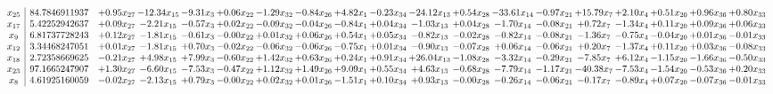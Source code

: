 \documentclass[9pt]{article}
\begin{document}
 \[\begin{array}{c| c c@{\hskip 2pt} c@{\hskip 2pt} c@{\hskip 2pt} c@{\hskip 2pt} c@{\hskip 2pt} c@{\hskip 2pt} c@{\hskip 2pt} c@{\hskip 2pt} c@{\hskip 2pt} c@{\hskip 2pt} c@{\hskip 2pt} c@{\hskip 2pt} c@{\hskip 2pt} c@{\hskip 2pt} c@{\hskip 2pt} c@{\hskip 2pt} c@{\hskip 2pt} }
 x_{25}   &  84.7846911937 & +  0.95 x_{27} & -12.34 x_{15} & -9.31 x_{3} & +  0.06 x_{22} & -1.29 x_{32} & -0.84 x_{26} & +  4.82 x_{1} & -0.23 x_{34} & -24.12 x_{13} & +  0.54 x_{28} & -33.61 x_{14} & -0.97 x_{21} & + 15.79 x_{7} & +  2.10 x_{4} & +  0.51 x_{20} & +  0.96 x_{36} & +  0.80 x_{33}\\
 x_{17}   &  5.42252942637 & +  0.09 x_{27} & -2.21 x_{15} & -0.57 x_{3} & +  0.02 x_{22} & -0.09 x_{32} & -0.04 x_{26} & -0.84 x_{1} & +  0.04 x_{34} & -1.03 x_{13} & +  0.04 x_{28} & -1.70 x_{14} & -0.08 x_{21} & +  0.72 x_{7} & -1.34 x_{4} & +  0.11 x_{20} & +  0.09 x_{36} & +  0.06 x_{33}\\
 x_{9}   &  6.81737728243 & +  0.12 x_{27} & -1.81 x_{15} & -0.61 x_{3} & -0.00 x_{22} & +  0.01 x_{32} & +  0.06 x_{26} & +  0.54 x_{1} & +  0.05 x_{34} & -0.82 x_{13} & -0.02 x_{28} & -0.82 x_{14} & -0.08 x_{21} & -1.36 x_{7} & -0.75 x_{4} & -0.04 x_{20} & +  0.01 x_{36} & -0.01 x_{33}\\
 x_{12}   &  3.34468247051 & +  0.01 x_{27} & -1.81 x_{15} & +  0.70 x_{3} & -0.02 x_{22} & -0.06 x_{32} & -0.06 x_{26} & -0.75 x_{1} & +  0.01 x_{34} & -0.90 x_{13} & -0.07 x_{28} & +  0.06 x_{14} & -0.06 x_{21} & +  0.20 x_{7} & -1.37 x_{4} & +  0.11 x_{20} & +  0.03 x_{36} & -0.08 x_{33}\\
 x_{18}   &  2.72358669625 & -0.21 x_{27} & +  4.98 x_{15} & +  7.99 x_{3} & -0.60 x_{22} & +  1.42 x_{32} & +  0.63 x_{26} & +  0.24 x_{1} & +  0.91 x_{34} & + 26.04 x_{13} & -1.08 x_{28} & -3.32 x_{14} & -0.29 x_{21} & -7.85 x_{7} & +  6.12 x_{4} & -1.15 x_{20} & -1.66 x_{36} & -0.50 x_{33}\\
 x_{23}   &  97.1665247907 & +  1.30 x_{27} & -6.60 x_{15} & -7.53 x_{3} & -0.47 x_{22} & +  1.12 x_{32} & +  1.49 x_{26} & +  9.09 x_{1} & +  0.55 x_{34} & +  4.63 x_{13} & -0.68 x_{28} & -7.79 x_{14} & -1.17 x_{21} & -40.38 x_{7} & -7.53 x_{4} & -1.54 x_{20} & -0.53 x_{36} & +  0.20 x_{33}\\
 x_{8}   &  4.61925160059 & -0.02 x_{27} & -2.13 x_{15} & +  0.79 x_{3} & -0.00 x_{22} & +  0.02 x_{32} & +  0.01 x_{26} & -1.51 x_{1} & +  0.10 x_{34} & +  0.93 x_{13} & -0.00 x_{28} & -0.26 x_{14} & -0.06 x_{21} & -0.17 x_{7} & -0.89 x_{4} & +  0.07 x_{20} & -0.07 x_{36} & -0.01 x_{33}\\

\end{array}\]
\end{document}
